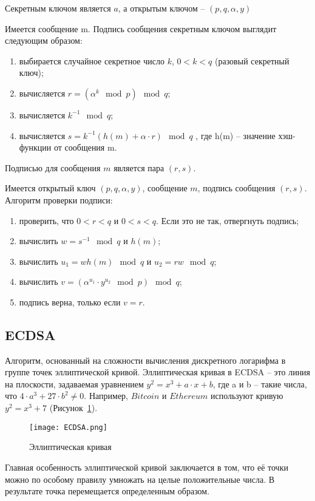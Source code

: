 Секретным ключом является $a$, а открытым ключом -- $(p, q, \alpha, y)$

Имеется сообщение m. Подпись сообщения секретным ключом выглядит следующим образом:
\begin{enumerate}
	\item выбирается случайное секретное число $k$, $0 < k < q$ (разовый секретный ключ);
	\item вычисляется $r = (\alpha^k \mod p) \mod q$;
	\item вычисляется $k^{-1} \mod q$;
	\item вычисляется $s = k^{-1} (h(m) + \alpha \cdot r) \mod q$ , где h(m) -- значение хэш-функции от сообщения m.
\end{enumerate}

Подписью для сообщения $m$ является пара $(r, s)$.

Имеется открытый ключ $(p, q, \alpha ,y)$, сообщение $m$, подпись сообщения $(r, s)$.
Алгоритм проверки подписи:
\begin{enumerate}
	\item проверить, что $0 < r < q$ и $0 < s < q$. Если это не так, отвергнуть подпись;
	\item вычислить $w = s^{-1} \mod q$ и $h(m)$;
	\item вычислить $u_1 = wh(m) \mod q$ и $u_2 = rw \mod q$;
	\item вычислить $v = (\alpha^{u_1} \cdot y^{u_2} \mod p) \mod q$;
	\item подпись верна, только если $v = r$.
\end{enumerate}

\subsection{ECDSA}

Алгоритм, основанный на сложности вычисления дискретного логарифма в группе точек эллиптической кривой. Эллиптическая кривая в ECDSA -- это линия на плоскости, задаваемая уравнением $y^2 = x^3 + a \cdot x + b$, где a и b -- такие числа, что $4 \cdot a^3 + 27 \cdot b^2 \neq 0$. Например, $Bitcoin$ и $Ethereum$ используют кривую $y^2 = x^3 + 7$ (Рисунок~\ref{fig:ecdsa}).

\begin{figure}[H]
	\centering
	\texttt{[image: ECDSA.png]}
	\caption{Эллиптическая кривая}
	\label{fig:ecdsa}
\end{figure}

Главная особенность эллиптической кривой заключается в том, что её точки можно по особому правилу умножать на целые положительные числа. В результате точка перемещается определенным образом.

